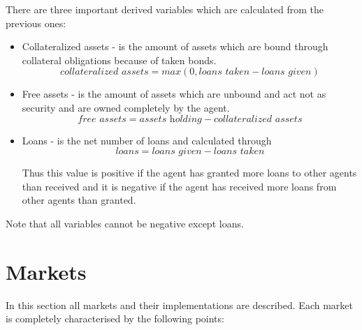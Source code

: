 \documentclass[Bachelorarbeit.tex]{subfiles}
\begin{document}
\medskip

There are three important derived variables which are calculated from the previous ones:

\begin{itemize}
\item Collateralized assets - is the amount of assets which are bound through collateral obligations because of taken bonds. 
\begin{equation}
\textit{collateralized assets} = max( 0, \textit{loans taken} - \textit{loans given} )
\label{eq:COLLATERALIZED_ASSETS_WITH_BP}
\end{equation}

\item Free assets - is the amount of assets which are unbound and act not as security and are owned completely by the agent.
\begin{equation}
\textit{free assets} = \textit{assets holding} - \textit{collateralized assets}
\end{equation}

\item Loans - is the net number of loans and calculated through 
\begin{equation}
\textit{loans} = \textit{loans given} - \textit{loans taken}
\end{equation}

Thus this value is positive if the agent has granted more loans to other agents than received and it is negative if the agent has received more loans from other agents than granted.
\end{itemize}

Note that all variables cannot be negative except loans.

\section{Markets}
\label{sec:MARKETS}
In this section all markets and their implementations are described. Each market is completely characterised by the following points:
\end{document}
